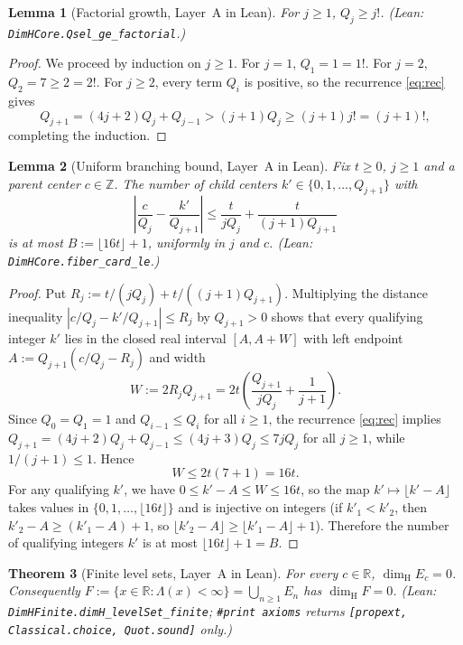 \documentclass[11pt]{article}
\newtheorem{theorem}{Theorem}
\newtheorem{lemma}[theorem]{Lemma}
\theoremstyle{definition}
\theoremstyle{remark}
\newcommand{\R}{\mathbb{R}}
\newcommand{\Z}{\mathbb{Z}}
\newcommand{\dimH}{\dim_{\mathrm{H}}}
\newcommand{\Lam}{\Lambda}
\begin{document}
\begin{lemma}[Factorial growth, Layer~A in Lean]\label{lem:factorial}
For $j\ge1$, $Q_j\ge j!$. (Lean: \texttt{DimHCore.\allowbreak Qsel\_ge\_factorial}.)
\end{lemma}

\begin{proof}
We proceed by induction on $j\ge1$. For $j=1$, $Q_1=1=1!$. For $j=2$,
$Q_2=7\ge2=2!$. For $j\ge2$, every term $Q_i$ is positive, so the recurrence
\eqref{eq:rec} gives
\[
Q_{j+1}=(4j+2)Q_j+Q_{j-1}>(j+1)Q_j\ge(j+1)j!=(j+1)!,
\]
completing the induction.
\end{proof}

\begin{lemma}[Uniform branching bound, Layer~A in Lean]\label{lem:branch}
Fix $t\ge0$, $j\ge1$ and a parent center $c\in\Z$. The number of child centers
$k'\in\{0,1,\dots,Q_{j+1}\}$ with
\[
\left|\frac{c}{Q_j}-\frac{k'}{Q_{j+1}}\right|\le \frac{t}{jQ_j}+\frac{t}{(j+1)Q_{j+1}}
\]
is at most $B:=\lfloor16t\rfloor+1$, \emph{uniformly in $j$ and $c$}.
(Lean: \texttt{DimHCore.\allowbreak fiber\_card\_le}.)
\end{lemma}

\begin{proof}
Put $R_j:=t/(jQ_j)+t/((j+1)Q_{j+1})$. Multiplying the distance inequality
$|c/Q_j-k'/Q_{j+1}|\le R_j$ by $Q_{j+1}>0$ shows that every qualifying integer
$k'$ lies in the closed real interval $[A,A+W]$ with left endpoint
$A:=Q_{j+1}(c/Q_j-R_j)$ and width
\[
W:=2R_jQ_{j+1}=2t\left(\frac{Q_{j+1}}{jQ_j}+\frac{1}{j+1}\right).
\]
Since $Q_0=Q_1=1$ and $Q_{i-1}\le Q_i$ for all $i\ge1$, the recurrence
\eqref{eq:rec} implies $Q_{j+1}=(4j+2)Q_j+Q_{j-1}\le(4j+3)Q_j\le7jQ_j$ for all
$j\ge1$, while $1/(j+1)\le1$. Hence
\[
W\le 2t(7+1)=16t.
\]
For any qualifying $k'$, we have $0\le k'-A\le W\le16t$, so the map
$k'\mapsto\lfloor k'-A\rfloor$ takes values in $\{0,1,\dots,\lfloor16t\rfloor\}$
and is injective on integers (if $k'_1<k'_2$, then $k'_2-A\ge(k'_1-A)+1$, so
$\lfloor k'_2-A\rfloor\ge\lfloor k'_1-A\rfloor+1$). Therefore the number of
qualifying integers $k'$ is at most $\lfloor16t\rfloor+1=B$.
\end{proof}

\begin{theorem}[Finite level sets, Layer~A in Lean]\label{thm:finite}
For every $c\in\R$, $\dimH E_c=0$. Consequently
$F:=\{x\in\R:\Lam(x)<\infty\}=\bigcup_{n\ge1}E_n$ has $\dimH F=0$.
(Lean: \texttt{DimHFinite.\allowbreak dimH\_levelSet\_finite}; \texttt{\#print axioms}
returns \texttt{[propext, Classical.choice, Quot.sound]} only.)
\end{theorem}
\end{document}
